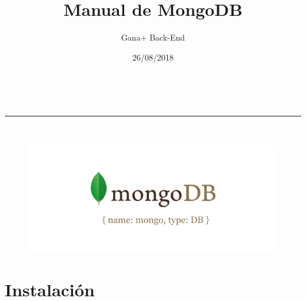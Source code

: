 \documentclass[a4paper,11pt]{paper}
\makeatletter
\newcommand{\linia}{\rule{\linewidth}{0.5pt}}
\renewcommand{\maketitle}{
\begin{center}
\vspace{2ex}
{\huge \textsc{\@title}}
\vspace{1ex}
\\
\linia\\
\@author \hfill \@date
\vspace{4ex}
\end{center}
}
\makeatother
\begin{document}
\title{Manual de MongoDB}

\author{Gana+ Back-End}

\date{26/08/2018}
\maketitle
\vspace*{\fill}
\begin{figure}[!h]
\centering
\includegraphics[width=1.0\textwidth]{imgs/Mongo.png}
\end{figure}
\vspace*{\fill}

\newpage
\tableofcontents
\newpage
{}


\section{Instalación}
\end{document}
